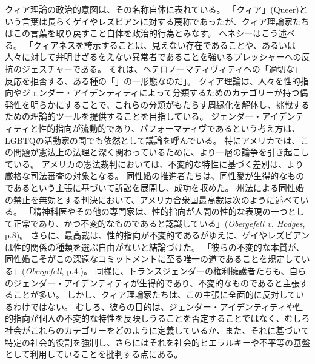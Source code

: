 \documentclass[paper=a4,book,openany]{jlreq}
\begin{document}
クィア理論の政治的意図は、その名称自体に表れている。
「クィア」(Queer)という言葉は長らくゲイやレズビアンに対する蔑称であったが、クィア理論家たちはこの言葉を取り戻すこと自体を政治的行為とみなす。
ヘネシーはこう述べる。
「クィアネスを誇示することは、見えない存在であることや、あるいは人々に対して弁明せざるをえない異常者であることを強いるプレッシャーへの反抗のジェスチャーである。
それは、ヘテロノーマティヴィティへの「適切な」反応を拒否する、ある種の「」の一形態なのだ」\citep[p.867]{hennessy93:_queer_theor}。
クィア理論は、人々を性的指向やジェンダー・アイデンティティによって分類するためのカテゴリーが持つ偶発性を明らかにすることで、これらの分類がもたらす周縁化を解体し、挑戦するための理論的ツールを提供することを目指している。
ジェンダー・アイデンティティと性的指向が流動的であり、パフォーマティヴであるという考え方は、LGBTQの活動家の間でも依然として議論を呼んでいる。
特にアメリカでは、この問題が憲法上の法理と深く関わっているために、より一層の論争を引き起こしている。
アメリカの憲法裁判においては、不変的な特性に基づく差別は、より厳格な司法審査の対象となる。
同性婚の推進者たちは、同性愛が生得的なものであるという主張に基づいて訴訟を展開し、成功を収めた。
州法による同性婚の禁止を無効とする判決において、アメリカ合衆国最高裁は次のように述べている。
「精神科医やその他の専門家は、性的指向が人間の性的な表現の一つとして正常であり、かつ不変的なものであると認識している」(\emph{Obergefell v. Hodges}, p.8)。
さらに、最高裁は、性的指向が不変的であるがゆえに、ゲイやレズビアンは性的関係の種類を選ぶ自由がないと結論づけた。
「彼らの不変的な本質が、同性婚こそがこの深遠なコミットメントに至る唯一の道であることを規定している」(\emph{Obergefell}, p.4.)。
同様に、トランスジェンダーの権利擁護者たちも、自らのジェンダー・アイデンティティが生得的であり、不変的なものであると主張することが多い。
しかし、クィア理論家たちは、この主張に全面的に反対しているわけではない。
むしろ、彼らの目的は、ジェンダー・アイデンティティや性的指向が個人の不変的な特性を反映しうることを否定することではなく、むしろ社会がこれらのカテゴリーをどのように定義しているか、また、それに基づいて特定の社会的役割を強制し、さらにはそれを社会的ヒエラルキーや不平等の基盤として利用していることを批判する点にある。
\end{document}
